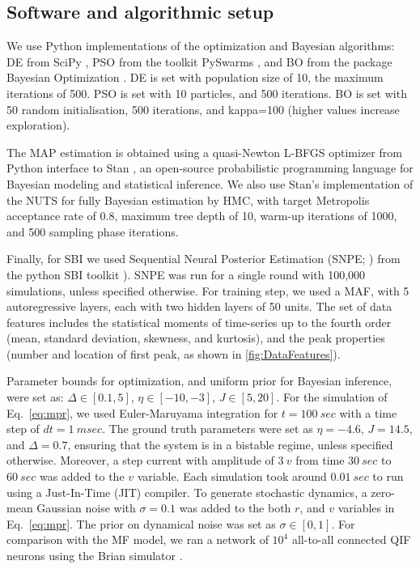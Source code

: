 \documentclass[preprint,11pt,authoryear]{elsarticle}
\begin{document}
\subsection{Software and algorithmic setup} 

We use Python implementations of the optimization and Bayesian algorithms: DE from SciPy \citep{Virtanen2020scipy}, PSO from the toolkit PySwarms \citep{Miranda2018pyswarms}, and BO from the package Bayesian Optimization \citep{Nogueira2014BO}. DE is set with population size of 10, the maximum iterations of 500. PSO is set with 10 particles, and 500 iterations. BO is set with 50 random initialisation, 500 iterations, and kappa=100 (higher values increase exploration).

The MAP estimation is obtained using a quasi-Newton L-BFGS optimizer from Python interface to Stan \citep{Carpenter2017}, an open-source probabilistic programming language for Bayesian modeling and statistical inference. We also use Stan's implementation of the NUTS for fully Bayesian estimation by HMC, with target Metropolis acceptance rate of 0.8, maximum tree depth of 10, warm-up iterations of 1000, and 500 sampling phase iterations. 

Finally, for SBI we used Sequential Neural Posterior Estimation (SNPE; \cite{Greenberg2019, Goncalves2020}) from the python SBI toolkit \citep{Tejero2020sbi}). SNPE was run for a single round with 100,000 simulations, unless specified otherwise. For training step, we used a MAF, with 5 autoregressive layers, each with two hidden layers of 50 units.
The set of data features includes the statistical moments of time-series up to the fourth order (mean, standard deviation, skewness, and kurtosis), and the peak properties (number and location of first peak, as shown in \autoref{fig:DataFeatures}).


Parameter bounds for optimization, and  uniform prior for Bayesian inference, were set as: $\Delta \in [0.1, 5]$, $\eta \in [-10, -3]$, $J \in [5, 20]$. For the simulation of Eq.~\ref{eq:mpr}, we used Euler-Maruyama integration for $t=100~sec$ with a time step of $dt=1~msec$. The ground truth parameters were set as $\eta=-4.6$, $J=14.5$, and $\Delta=0.7$, ensuring that the system is in a bistable regime, unless specified otherwise. Moreover, a step current with amplitude of $3~v$ from time $30~sec$ to $60~sec$ was added to the $v$ variable. Each simulation took around $0.01~sec$ to run using a Just-In-Time (JIT) compiler.
To generate stochastic dynamics, a zero-mean Gaussian noise with $\sigma=0.1$ was added to the both $r$, and $v$ variables in Eq.~\ref{eq:mpr}.  The prior on dynamical noise was set as $\sigma \in [0, 1]$.
For comparison with the MF model, we ran a network of $10^4$ all-to-all connected QIF neurons using the Brian simulator \citep{Stimberg2019}.
 
\end{document}
